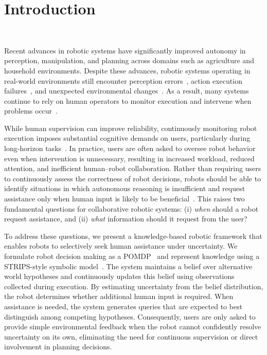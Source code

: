
\section{Introduction}~\label{intro}

Recent advances in robotic systems have significantly improved autonomy in perception, manipulation, and planning across domains such as agriculture and household environments. Despite these advances, robotic systems operating in real-world environments still encounter perception errors~\cite{kaipa2016addressing}, action execution failures~\cite{kaelbling1998planning}, and unexpected environmental changes~\cite{kurniawati2016online}. As a result, many systems continue to rely on human operators to monitor execution and intervene when problems occur~\cite{dragan2013legibility, goodrich2008human}.

While human supervision can improve reliability, continuously monitoring robot execution imposes substantial cognitive demands on users, particularly during long-horizon tasks~\cite{chen2014human}. In practice, users are often asked to oversee robot behavior even when intervention is unnecessary, resulting in increased workload, reduced attention, and inefficient human--robot collaboration. Rather than requiring users to continuously assess the correctness of robot decisions, robots should be able to identify situations in which autonomous reasoning is insufficient and request assistance only when human input is likely to be beneficial~\cite{sadigh2017active, leusmann2023understanding}. This raises two fundamental questions for collaborative robotic systems: (i) \textit{when} should a robot request assistance, and (ii) \textit{what} information should it request from the user?

To address these questions, we present a knowledge-based robotic framework that enables robots to selectively seek human assistance under uncertainty. We formulate robot decision making as a POMDP~\cite{kaelbling1998planning} and represent knowledge using a STRIPS-style symbolic model~\cite{fikes1971strips}. The system maintains a belief over alternative world hypotheses and continuously updates this belief using observations collected during execution. By estimating uncertainty from the belief distribution, the robot determines whether additional human input is required. When assistance is needed, the system generates queries that are expected to best distinguish among competing hypotheses. Consequently, users are only asked to provide simple environmental feedback when the robot cannot confidently resolve uncertainty on its own, eliminating the need for continuous supervision or direct involvement in planning decisions.

